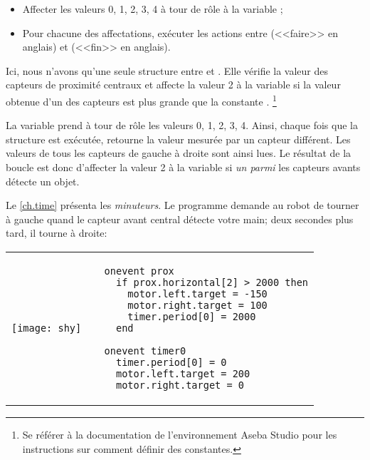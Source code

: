 \begin{itemize}
\item Affecter les valeurs 0, 1, 2, 3, 4 à tour de rôle à la variable ;
\item Pour chacune des affectations, exécuter les actions entre  (<<faire>> en anglais)
    et  (<<fin>> en anglais).
\end{itemize}

Ici, nous n'avons qu'une seule structure  entre  et .
Elle vérifie la valeur des capteurs de proximité centraux et affecte la valeur 2 à la variable
 si la valeur obtenue d'un des capteurs est plus grande que la constante .
\footnote{Se référer à la documentation de l'environnement Aseba Studio pour les instructions
sur comment définir des constantes.}

La variable  prend à tour de rôle les valeurs 0, 1, 2, 3, 4.
Ainsi, chaque fois que la structure  est exécutée,  retourne
la valeur mesurée par un capteur différent. Les valeurs de tous les capteurs de gauche à droite
sont ainsi lues.
Le résultat de la boucle  est donc d'affecter la valeur 2 à la variable 
si \emph{un parmi} les capteurs avants détecte un objet.


Le \cref{ch.time} présenta les \emph{minuteurs}.
Le programme  demande au robot de tourner à gauche quand le capteur avant central
détecte votre main; deux secondes plus tard, il tourne à droite:

\begin{center}
\begin{tabular}{ll}
\texttt{[image: shy]} &
\begin{minipage}[b]{.5\textwidth}
\begin{footnotesize}
\begin{verbatim}
  onevent prox
    if prox.horizontal[2] > 2000 then
      motor.left.target = -150
      motor.right.target = 100
      timer.period[0] = 2000
    end
  
  onevent timer0
    timer.period[0] = 0
    motor.left.target = 200
    motor.right.target = 0
\end{verbatim}
\end{footnotesize}
\end{minipage}
\end{tabular}
\end{center}

